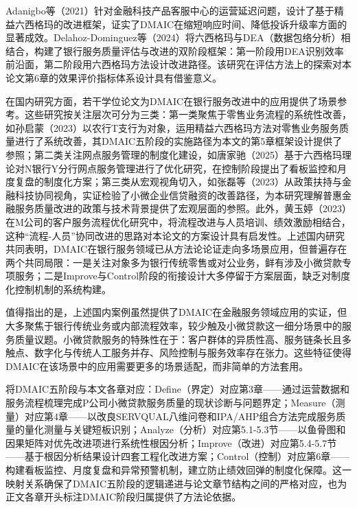 Adanigbo等（2021）针对金融科技产品客服中心的运营延迟问题，设计了基于精益六西格玛的改进框架，证实了DMAIC在缩短响应时间、降低投诉升级率方面的显著成效\cite{ref49}。Delahoz-Dominguez等（2024）将六西格玛与DEA（数据包络分析）相结合，构建了银行服务质量评估与改进的双阶段框架：第一阶段用DEA识别效率前沿面，第二阶段用六西格玛方法设计改进路径\cite{ref50}。该研究在评估方法上的探索对本论文第6章的效果评价指标体系设计具有借鉴意义。\par

在国内研究方面，若干学位论文为DMAIC在银行服务改进中的应用提供了场景参考。这些研究按关注层次可分为三类：第一类聚焦于零售业务流程的系统性改善，如孙启蒙（2023）以农行T支行为对象，运用精益六西格玛方法对零售业务服务质量进行了系统改善，其DMAIC五阶段的实施路径为本文的第5章框架设计提供了参照\cite{ref12}；第二类关注网点服务管理的制度化建设，如唐家驰（2025）基于六西格玛理论对N银行Y分行网点服务管理进行了优化研究，在控制阶段提出了看板监控和月度复盘的制度化方案\cite{ref51}；第三类从宏观视角切入，如张磊等（2023）从政策扶持与金融科技协同视角，实证检验了小微企业信贷融资的改善路径，为本研究理解普惠金融服务质量改进的政策与技术背景提供了宏观层面的参照\cite{ref52}。此外，黄玉婷（2023）在M公司的客户服务流程优化研究中，将流程改进与人员培训、绩效激励相结合，这种“流程-人员”协同改进的思路对本论文的方案设计具有启发性\cite{ref53}。上述国内研究共同表明，DMAIC在银行服务领域已从方法论论证走向多场景应用，但普遍存在两个共同局限：一是关注对象多为银行传统零售或对公业务，鲜有涉及小微贷款专项服务；二是Improve与Control阶段的衔接设计大多停留于方案层面，缺乏对制度化控制机制的系统构建。\par

值得指出的是，上述国内案例虽然提供了DMAIC在金融服务领域应用的实证，但大多聚焦于银行传统业务或内部流程效率，较少触及小微贷款这一细分场景中的服务质量议题。小微贷款服务的特殊性在于：客户群体的异质性高、服务链条长且多触点、数字化与传统人工服务并存、风险控制与服务效率存在张力。这些特征使得DMAIC在该场景中的应用需要更多的场景适配，而非简单的方法套用。\par

将DMAIC五阶段与本文各章对应：Define（界定）对应第3章——通过运营数据和服务流程梳理完成P公司小微贷款服务质量的现状诊断与问题界定；Measure（测量）对应第4章——以改良SERVQUAL八维问卷和IPA/AHP组合方法完成服务质量的量化测量与关键短板识别；Analyze（分析）对应第5.1-5.3节——以鱼骨图和因果矩阵对优先改进项进行系统性根因分析；Improve（改进）对应第5.4-5.7节——基于根因分析结果设计四套工程化改进方案；Control（控制）对应第6章——构建看板监控、月度复盘和异常预警机制，建立防止绩效回弹的制度化保障。这一映射关系确保了DMAIC五阶段的逻辑递进与论文章节结构之间的严格对应，也为正文各章开头标注DMAIC阶段归属提供了方法论依据。\par

